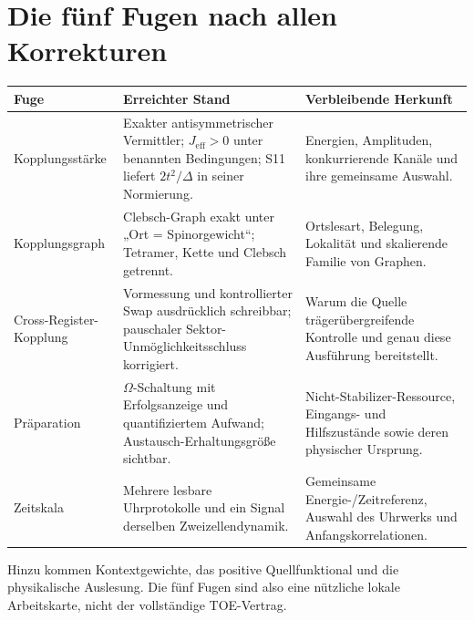 \section{Die fünf Fugen nach allen Korrekturen}
\begin{longtable}{L{31mm}L{62mm}L{57mm}}
\toprule \textbf{Fuge}&\textbf{Erreichter Stand}&\textbf{Verbleibende Herkunft}\\\midrule\endhead
Kopplungsstärke&Exakter antisymmetrischer Vermittler; $J_{\mathrm{eff}}>0$ unter benannten Bedingungen; S11 liefert $2t^2/\Delta$ in seiner Normierung.&Energien, Amplituden, konkurrierende Kanäle und ihre gemeinsame Auswahl.\\
Kopplungsgraph&Clebsch-Graph exakt unter „Ort = Spinorgewicht“; Tetramer, Kette und Clebsch getrennt.&Ortslesart, Belegung, Lokalität und skalierende Familie von Graphen.\\
Cross-Register-Kopplung&Vormessung und kontrollierter Swap ausdrücklich schreibbar; pauschaler Sektor-Unmöglichkeitsschluss korrigiert.&Warum die Quelle trägerübergreifende Kontrolle und genau diese Ausführung bereitstellt.\\
Präparation&$\Omega$-Schaltung mit Erfolgsanzeige und quantifiziertem Aufwand; Austausch-Erhaltungsgröße sichtbar.&Nicht-Stabilizer-Ressource, Eingangs- und Hilfszustände sowie deren physischer Ursprung.\\
Zeitskala&Mehrere lesbare Uhrprotokolle und ein Signal derselben Zweizellendynamik.&Gemeinsame Energie-/Zeitreferenz, Auswahl des Uhrwerks und Anfangskorrelationen.\\\bottomrule
\end{longtable}
Hinzu kommen Kontextgewichte, das positive Quellfunktional und die physikalische Auslesung. Die fünf Fugen sind also eine nützliche lokale Arbeitskarte, nicht der vollständige TOE-Vertrag.

